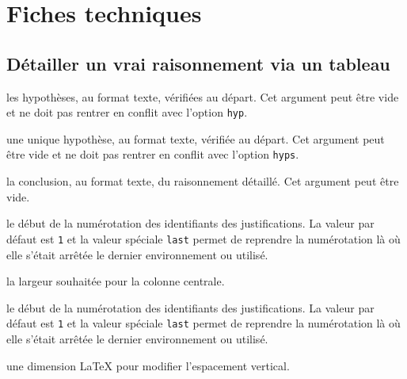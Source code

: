 \documentclass[12pt,a4paper]{article}
\begin{document}

\section{Fiches techniques}

\subsection{Détailler un \og vrai \fg{} raisonnement via un tableau}


   les hypothèses, au format texte, vérifiées au départ.
               Cet argument peut être vide et ne doit pas rentrer en conflit avec l'option \verb+hyp+.

    une unique hypothèse, au format texte, vérifiée au départ.
               Cet argument peut être vide et ne doit pas rentrer en conflit avec l'option \verb+hyps+.

    la conclusion, au format texte, du raisonnement détaillé.
               Cet argument peut être vide.

\extraspace

  le début de la numérotation des identifiants des justifications.
               La valeur par défaut est \verb+1+ et la valeur spéciale \verb+last+ permet de reprendre la numérotation là où elle s'était arrêtée le dernier environnement  ou  utilisé.

 la largeur souhaitée pour la colonne centrale.



\separation



 le début de la numérotation des identifiants des justifications.
              La valeur par défaut est \verb+1+ et la valeur spéciale \verb+last+ permet de reprendre la numérotation là où elle s'était arrêtée le dernier environnement  ou  utilisé.


\separation



\IDoption{} une dimension \LaTeX{} pour modifier l'espacement vertical.
\end{document}
